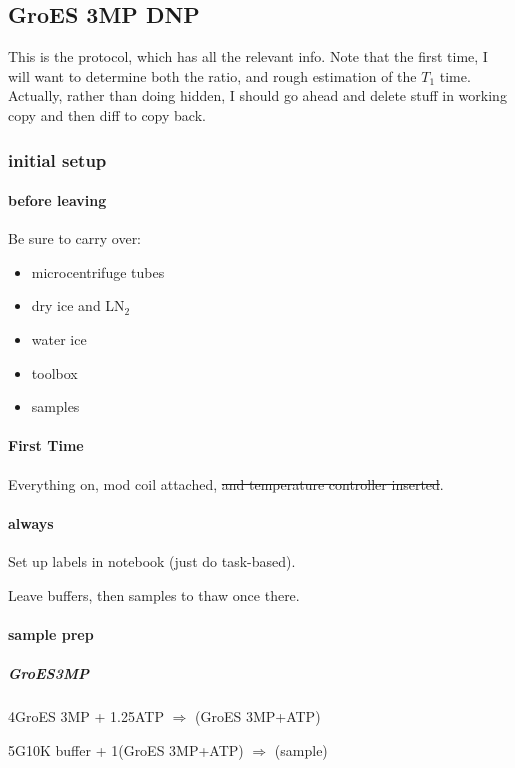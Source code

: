 \subsection{GroES 3MP DNP}\label{sec:groes3mpreprod_groesdnprep2}
\timeblockstart
{}
This is the protocol, which has all the relevant info.
Note that the first time, I will want to determine both the ratio, and rough estimation of the $T_1$ time.
Actually, rather than doing hidden, I should go ahead and delete stuff in working copy and then diff to copy back.

\subsubsection{initial setup}
\paragraph{before leaving}
Be sure to carry over:
\begin{itemize}
    \item microcentrifuge tubes
    \item dry ice and LN$_2$
    \item water ice 
    \item toolbox 
    \item samples
\end{itemize}

\paragraph{First Time}

Everything on, mod coil attached, \sout{and temperature controller inserted}.

\paragraph{always}
Set up labels in notebook (just do task-based).

Leave buffers, then samples to thaw once there.

\paragraph{sample prep}
\subparagraph{GroES3MP}
4\uL GroES 3MP + 1.25\M ATP $\Rightarrow$ (GroES 3MP+ATP)

5\uL G10K buffer + 1\uL (GroES 3MP+ATP) $\Rightarrow$ (sample)

